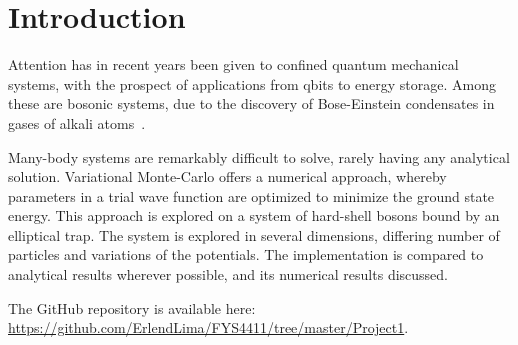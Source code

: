 \section{Introduction}

Attention has in recent years been given to confined quantum mechanical systems,
with the prospect of applications from qbits to energy storage. Among these
are bosonic systems, due to the discovery of Bose-Einstein condensates in gases
of alkali atoms~\cite{Nilsen2005}.\newline

Many-body systems are remarkably difficult to solve, rarely having any
analytical solution. Variational Monte-Carlo offers a numerical approach,
whereby parameters in a trial wave function are optimized to minimize the ground
state energy. This approach is explored on a system of hard-shell bosons bound by an
elliptical trap. The system is explored in several dimensions, differing number
of particles and variations of the potentials. The implementation is compared
to analytical results wherever possible, and its numerical results discussed.
\newline

The GitHub repository is available here: \url{https://github.com/ErlendLima/FYS4411/tree/master/Project1}.

